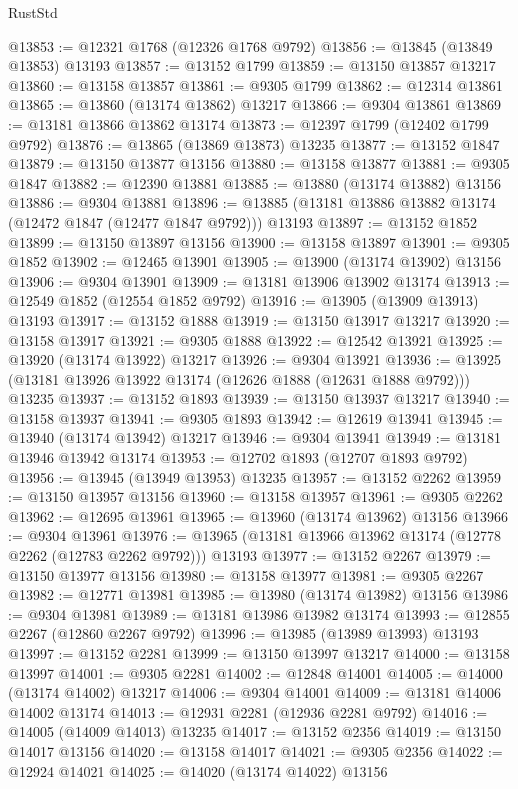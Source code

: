 \begin{lexlean}{RustStd}
\begin{coremodule}
@13853 := @12321 @1768 (@12326 @1768 @9792)
@13856 := @13845 (@13849 @13853) @13193
@13857 := @13152 @1799
@13859 := @13150 @13857 @13217
@13860 := @13158 @13857
@13861 := @9305 @1799
@13862 := @12314 @13861
@13865 := @13860 (@13174 @13862) @13217
@13866 := @9304 @13861
@13869 := @13181 @13866 @13862 @13174
@13873 := @12397 @1799 (@12402 @1799 @9792)
@13876 := @13865 (@13869 @13873) @13235
@13877 := @13152 @1847
@13879 := @13150 @13877 @13156
@13880 := @13158 @13877
@13881 := @9305 @1847
@13882 := @12390 @13881
@13885 := @13880 (@13174 @13882) @13156
@13886 := @9304 @13881
@13896 := @13885 (@13181 @13886 @13882 @13174 (@12472 @1847 (@12477 @1847 @9792))) @13193
@13897 := @13152 @1852
@13899 := @13150 @13897 @13156
@13900 := @13158 @13897
@13901 := @9305 @1852
@13902 := @12465 @13901
@13905 := @13900 (@13174 @13902) @13156
@13906 := @9304 @13901
@13909 := @13181 @13906 @13902 @13174
@13913 := @12549 @1852 (@12554 @1852 @9792)
@13916 := @13905 (@13909 @13913) @13193
@13917 := @13152 @1888
@13919 := @13150 @13917 @13217
@13920 := @13158 @13917
@13921 := @9305 @1888
@13922 := @12542 @13921
@13925 := @13920 (@13174 @13922) @13217
@13926 := @9304 @13921
@13936 := @13925 (@13181 @13926 @13922 @13174 (@12626 @1888 (@12631 @1888 @9792))) @13235
@13937 := @13152 @1893
@13939 := @13150 @13937 @13217
@13940 := @13158 @13937
@13941 := @9305 @1893
@13942 := @12619 @13941
@13945 := @13940 (@13174 @13942) @13217
@13946 := @9304 @13941
@13949 := @13181 @13946 @13942 @13174
@13953 := @12702 @1893 (@12707 @1893 @9792)
@13956 := @13945 (@13949 @13953) @13235
@13957 := @13152 @2262
@13959 := @13150 @13957 @13156
@13960 := @13158 @13957
@13961 := @9305 @2262
@13962 := @12695 @13961
@13965 := @13960 (@13174 @13962) @13156
@13966 := @9304 @13961
@13976 := @13965 (@13181 @13966 @13962 @13174 (@12778 @2262 (@12783 @2262 @9792))) @13193
@13977 := @13152 @2267
@13979 := @13150 @13977 @13156
@13980 := @13158 @13977
@13981 := @9305 @2267
@13982 := @12771 @13981
@13985 := @13980 (@13174 @13982) @13156
@13986 := @9304 @13981
@13989 := @13181 @13986 @13982 @13174
@13993 := @12855 @2267 (@12860 @2267 @9792)
@13996 := @13985 (@13989 @13993) @13193
@13997 := @13152 @2281
@13999 := @13150 @13997 @13217
@14000 := @13158 @13997
@14001 := @9305 @2281
@14002 := @12848 @14001
@14005 := @14000 (@13174 @14002) @13217
@14006 := @9304 @14001
@14009 := @13181 @14006 @14002 @13174
@14013 := @12931 @2281 (@12936 @2281 @9792)
@14016 := @14005 (@14009 @14013) @13235
@14017 := @13152 @2356
@14019 := @13150 @14017 @13156
@14020 := @13158 @14017
@14021 := @9305 @2356
@14022 := @12924 @14021
@14025 := @14020 (@13174 @14022) @13156

\end{coremodule}
\end{lexlean}
